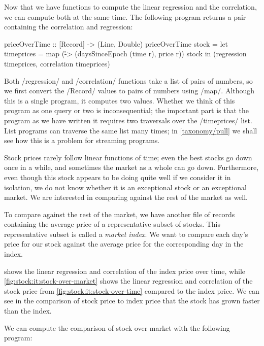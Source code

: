 Now that we have functions to compute the linear regression and the correlation, we can compute both at the same time.
The following program returns a pair containing the correlation and regression:

\begin{haskell}
priceOverTime :: [Record] -> (Line, Double)
priceOverTime stock =
  let timeprices = map (\r -> (daysSinceEpoch (time r), price r)) stock
  in (regression timeprices, correlation timeprices)
\end{haskell}

Both \Hs/regression/ and \Hs/correlation/ functions take a list of pairs of numbers, so we first convert the \Hs/Record/ values to pairs of numbers using \Hs/map/.
Although this is a single program, it computes two values.
Whether we think of this program as one query or two is inconsequential; the important part is that the program as we have written it requires two traversals over the \Hs/timeprices/ list.
List programs can traverse the same list many times; in \cref{taxonomy/pull} we shall see how this is a problem for streaming programs.

Stock prices rarely follow linear functions of time; even the best stocks go down once in a while, and sometimes the market as a whole can go down.
Furthermore, even though this stock appears to be doing quite well if we consider it in isolation, we do not know whether it is an exceptional stock or an exceptional market.
We are interested in comparing against the rest of the market as well.

To compare against the rest of the market, we have another file of records containing the average price of a representative subset of stocks.
This representative subset is called a \emph{market index}.
We want to compare each day's price for our stock against the average price for the corresponding day in the index.



 shows the linear regression and correlation of the index price over time, while \cref{fig:stock:it:stock-over-market} shows the linear regression and correlation of the stock price from \cref{fig:stock:it:stock-over-time} compared to the index price.
We can see in the comparison of stock price to index price that the stock has grown faster than the index.


We can compute the comparison of stock over market with the following program:


